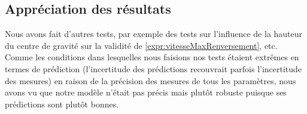 \subsection{Appréciation des résultats} Nous avons fait d'autres tests, par exemple des tests sur l'influence de la hauteur du centre de gravité sur la validité de \ref{expr:vitesseMaxRenversement}, etc. Comme les conditions dans lesquelles nous faisions nos tests étaient extrêmes en termes de prédiction (l'incertitude des prédictions recouvrait parfois l'incertitude des mesures) en raison de la précision des mesures de tous les paramètres, nous avons vu que notre modèle n'était pas précis mais plutôt robuste puisque ses prédictions sont plutôt bonnes.

